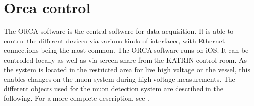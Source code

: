   \section{Orca control}
  \label{ch:The muon detection system:sec:OrcaControl}
  The ORCA software is the central software for data acquisition. It is able to control the different devices via various kinds of interfaces, with Ethernet connections being the most common. The ORCA software runs on iOS. It can be controlled locally as well as via screen share from the KATRIN control room. As the system is located in the restricted area for live high voltage on the vessel, this enables changes on the muon system during high voltage measurements. The different objects used for the muon detection system are described in the following. For a more complete description, see \cite{norman}.

